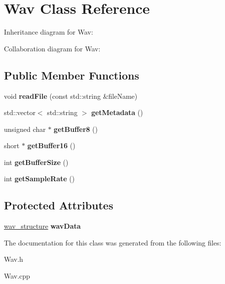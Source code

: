 \hypertarget{classWav}{}\section{Wav Class Reference}
\label{classWav}


Inheritance diagram for Wav\+:


Collaboration diagram for Wav\+:
\subsection*{Public Member Functions}
\begin{DoxyCompactItemize}
\item 
\mbox{\label{classWav_a1c4230cec49d30147a5b8a1950083f7c}} 
void {\bfseries read\+File} (const std\+::string \&file\+Name)
\item 
\mbox{\label{classWav_a8a7723047f78dead136bde3dbf5ba606}} 
std\+::vector$<$ std\+::string $>$ {\bfseries get\+Metadata} ()
\item 
\mbox{\label{classWav_ac8f51e4ea075ed2bd5458a78b485e35e}} 
unsigned char $\ast$ {\bfseries get\+Buffer8} ()
\item 
\mbox{\label{classWav_af73d133f2837aeb5d509c7dd29900477}} 
short $\ast$ {\bfseries get\+Buffer16} ()
\item 
\mbox{\label{classWav_a11de10cb698ea0ea08f3a28580f21b39}} 
int {\bfseries get\+Buffer\+Size} ()
\item 
\mbox{\label{classWav_ac6005a86d05843683afc584be759b600}} 
int {\bfseries get\+Sample\+Rate} ()
\end{DoxyCompactItemize}
\subsection*{Protected Attributes}
\begin{DoxyCompactItemize}
\item 
\mbox{\label{classWav_a15d64a4955aa3255e81c7f7aa1aac661}} 
\hyperlink{structwav__structure}{wav\+\_\+structure} {\bfseries wav\+Data}
\end{DoxyCompactItemize}


The documentation for this class was generated from the following files\+:\begin{DoxyCompactItemize}
\item 
Wav.\+h\item 
Wav.\+cpp\end{DoxyCompactItemize}
